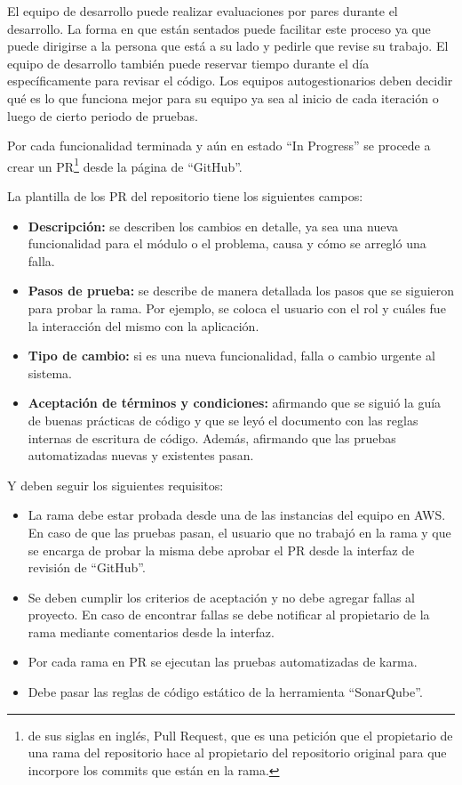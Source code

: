 El equipo de desarrollo puede realizar evaluaciones por pares durante el desarrollo. La forma en que están sentados puede facilitar este proceso ya que puede dirigirse a la persona que está a su lado y pedirle que revise su trabajo. El equipo de desarrollo también puede reservar tiempo durante el día específicamente para revisar el código. Los equipos autogestionarios deben decidir qué es lo que funciona mejor para su equipo ya sea al inicio de cada iteración o luego de cierto periodo de pruebas.

Por cada funcionalidad terminada y aún en estado \enquote{In Progress} se procede a crear un PR\footnote{de sus siglas en inglés, Pull Request, que es una petición que el propietario de una rama del repositorio hace al propietario del repositorio original para que incorpore los commits que están en la rama.} desde la página de \enquote{GitHub}. 

La plantilla de los PR del repositorio tiene los siguientes campos:
\begin{itemize}
	\item \textbf{Descripción:} se describen los cambios en detalle, ya sea una nueva funcionalidad para el módulo o el problema, causa y cómo se arregló una falla.
	\item \textbf{Pasos de prueba:} se describe de manera detallada los pasos que se siguieron para probar la rama. Por ejemplo, se coloca el usuario con el rol y cuáles fue la interacción del mismo con la aplicación.
	\item \textbf{Tipo de cambio:} si es una nueva funcionalidad, falla o cambio urgente al sistema.
	\item \textbf{Aceptación de términos y condiciones:} afirmando que se siguió la guía de buenas prácticas de código y que se leyó el documento con las reglas internas de escritura de código. Además, afirmando que las pruebas automatizadas nuevas y existentes pasan.
\end{itemize}

Y deben seguir los siguientes requisitos:
\begin{itemize}
	\item La rama debe estar probada desde una de las instancias del equipo en AWS. En caso de que las pruebas pasan, el usuario que no trabajó en la rama y que se encarga de probar la misma debe aprobar el PR desde la interfaz de revisión de \enquote{GitHub}.
	\item Se deben cumplir los criterios de aceptación y no debe agregar fallas al proyecto. En caso de encontrar fallas se debe notificar al propietario de la rama mediante comentarios desde la interfaz.
	\item Por cada rama en PR se ejecutan las pruebas automatizadas de karma.
	\item Debe pasar las reglas de código estático de la herramienta \enquote{SonarQube}.
\end{itemize}

